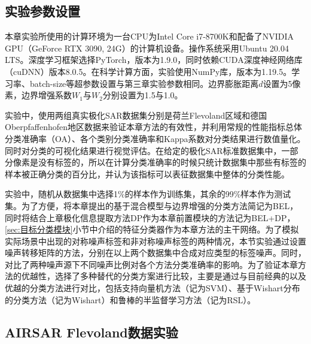 \subsection{实验参数设置}
本章实验所使用的计算环境为一台CPU为Intel Core i7-8700K和配备了NVIDIA GPU（GeForce RTX 3090, 24G）的计算机设备。操作系统采用Ubuntu 20.04 LTS。深度学习框架选择PyTorch，版本为1.9.0，同时依赖CUDA深度神经网络库（cuDNN）版本8.0.5。在科学计算方面，实验使用NumPy库，版本为1.19.5。学习率、batch-size等超参数设置与第三章实验参数相同。边界膨胀距离$d$设置为5像素，边界增强系数$W_1$与$W_2$分别设置为1.5与1.0。

实验中，使用两组真实极化SAR数据集分别是荷兰Flevoland区域和德国Oberpfaffenhofen地区数据来验证本章方法的有效性，并利用常规的性能指标总体分类准确率（OA）、各个类别分类准确率和Kappa系数对分类结果进行数值量化。同时对分类的可视化结果进行视觉评估。在给定的极化SAR标准数据集中，一部分像素是没有标签的，所以在计算分类准确率的时候只统计数据集中那些有标签的样本被正确分类的百分比，并认为该指标可以表征数据集中整体的分类性能。

实验中，随机从数据集中选择1\%的样本作为训练集，其余的99\%样本作为测试集。为了方便，将本章提出的基于混合模型与边界增强的分类方法简记为BEL，同时将结合上章极化信息提取方法DP作为本章前置模块的方法记为BEL+DP，\ref{sec:目标分类模块}小节中介绍的特征分类器作为本章方法的主干网络。为了模拟实际场景中出现的对称噪声标签和非对称噪声标签的两种情况，本节实验通过设置噪声转移矩阵的方法，分别在以上两个数据集中合成对应类型的标签噪声。同时，对比了两种噪声源下不同噪声比例对各个方法分类准确率的影响。为了验证本章方法的优越性，选择了多种替代的分类方案进行比较，主要是通过与目前经典的以及优越的分类方法进行对比，包括支持向量机方法（记为SVM）、基于Wishart分布的分类方法（记为Wishart）和鲁棒的半监督学习方法（记为RSL）。

\subsection{AIRSAR Flevoland数据实验}
